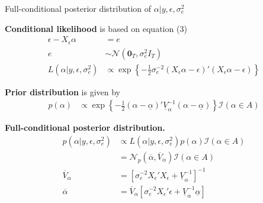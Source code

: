 \documentclass[notes,blackandwhite,mathsans,usenames,dvipsnames]{beamer}
\begin{document}
\begin{frame}{Full-conditional posterior distribution of $\alpha|y,\epsilon,\sigma^2_e$}

\small
\bigskip\textbf{Conditional likelihood} {\color{mcxs2}is based on equation} (3)
\begin{align*}
\epsilon-X_\epsilon \alpha &=e\\
e  &\sim\mathcal{N}\left(\mathbf{0}_T, \sigma^2_e I_T\right)\\
L\left(\alpha|y,\epsilon,\sigma^2_e\right)&\propto\exp\left\{-\frac{1}{2}\sigma^{-2}_e\left(X_\epsilon \alpha-\epsilon\right)'\left(X_\epsilon \alpha-\epsilon\right)  \right\}
\end{align*}

\smallskip\textbf{Prior distribution} {\color{mcxs2}is given by}
\begin{align*}
p(\alpha)&\propto \exp\left\{ -\frac{1}{2}(\alpha-\underline{\alpha})'\underline{V}_\alpha^{-1}(\alpha-\underline{\alpha}) \right\}\mathcal{I}(\alpha\in A)
\end{align*}

\smallskip\textbf{Full-conditional posterior distribution.}
\begin{align*}
p\left( \alpha|y,\epsilon,\sigma^2_e \right) &\propto L\left(\alpha|y,\epsilon,\sigma^2_e\right)p(\alpha)\mathcal{I}(\alpha\in A)\\
&= \mathcal{N}_p\left(\overline{\alpha},\overline{V}_\alpha\right)\mathcal{I}(\alpha\in A)\\
\overline{V}_\alpha &= \left[\sigma^{-2} _e X_\epsilon' X_\epsilon + \underline{V}_\alpha^{-1} \right]^{-1}\\
\overline{\alpha} &= \overline{V}_\alpha \left[\sigma^{-2} _e X_\epsilon' \epsilon + \underline{V}_\alpha^{-1}\underline{\alpha}  \right]
\end{align*}

\end{frame}
\end{document}
